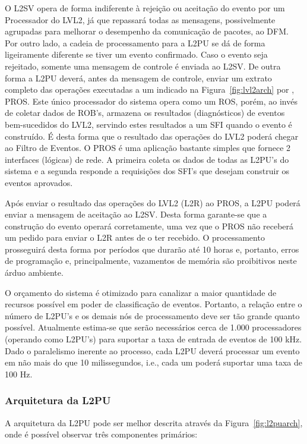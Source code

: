 O L2SV opera de forma indiferente à rejeição ou aceitação do evento por um
Processador do LVL2, já que repassará todas as mensagens, possivelmente
agrupadas para melhorar o desempenho da comunicação de pacotes, ao DFM. Por
outro lado, a cadeia de processamento para a L2PU se dá de forma ligeiramente
diferente se tiver um evento confirmado. Caso o evento seja rejeitado, somente
uma mensagem de controle é enviada ao L2SV. De outra forma a L2PU deverá,
antes da mensagem de controle, enviar um extrato completo das operações
executadas a um  indicado na Figura~\ref{fig:lvl2arch} por
, PROS. Este único processador do sistema opera como um ROS,
porém, ao invés de coletar dados de ROB's, armazena os resultados
(diagnósticos) de eventos bem-sucedidos do LVL2, servindo estes resultados a
um SFI quando o evento é construído. É desta forma que o resultado das
operações do LVL2 poderá chegar ao Filtro de Eventos. O PROS é uma aplicação
bastante simples que fornece 2 interfaces (lógicas) de rede. A primeira coleta
os dados de todas as L2PU's do sistema e a segunda responde a requisições dos
SFI's que desejam construir os eventos aprovados.

Após enviar o resultado das operações do LVL2 (L2R) ao PROS, a L2PU poderá
enviar a mensagem de aceitação ao L2SV. Desta forma garante-se que a
construção do evento operará corretamente, uma vez que o PROS não receberá um
pedido para enviar o L2R antes de o ter recebido. O processamento prosseguirá
desta forma por períodos que durarão até 10 horas e, portanto, erros de
programação e, principalmente, vazamentos de memória são proibitivos neste
árduo ambiente.

O orçamento do sistema é otimizado para canalizar a maior quantidade de
recursos possível em poder de classificação de eventos. Portanto, a relação
entre o número de L2PU's e os demais nós de processamento deve ser tão grande
quanto possível. Atualmente estima-se que serão necessários cerca de 1.000
processadores (operando como L2PU's) para suportar a taxa de entrada de
eventos de 100 kHz. Dado o paralelismo inerente ao processo, cada L2PU deverá
processar um evento em não mais do que 10 milissegundos, i.e., cada um poderá
suportar uma taxa de 100 Hz.

\subsubsection{Arquitetura da L2PU}
\label{sec:l2puarch}
A arquitetura da L2PU pode ser melhor descrita através da
Figura~\ref{fig:l2puarch}, onde é possível observar três componentes
primários:

